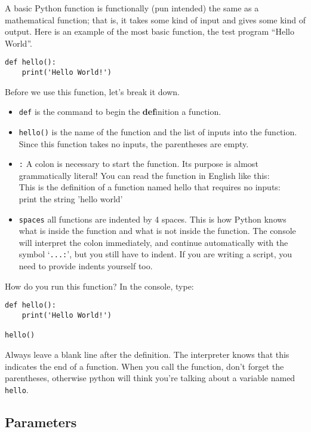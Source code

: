 \documentclass[]{article}
\renewcommand{\_}{\char`_}
\begin{document}
A basic Python function is functionally (pun intended) the same as a mathematical function; that is, it takes some kind of input and gives some kind of output. Here is an example of the most basic function, the test program ``Hello World''. 
\begin{lstlisting}
def hello():
    print('Hello World!')
\end{lstlisting}
Before we use this function, let's break it down. 
\begin{itemize}
\item \texttt{def} is the command to begin the \textbf{def}inition a function. 
\item \texttt{hello()} is the name of the function and the list of inputs into the function. Since this function takes no inputs, the parentheses are empty. 
\item \texttt{:} A colon is necessary to start the function. Its purpose is almost grammatically literal! You can read the function in English like this:\\[1ex] 
This is the definition of a function named hello that requires no inputs: \\
print the string 'hello world'

\item \texttt{spaces} all functions are indented by 4 spaces. This is how Python knows what is inside the function and what is not inside the function. The console will interpret the colon immediately, and continue automatically with the symbol `\texttt{...:}', but you still have to indent. If you are writing a script, you need to provide indents yourself too. 
\end{itemize}

How do you run this function? In the console, type: 
\begin{lstlisting}
def hello():
    print('Hello World!')

hello()
\end{lstlisting}
Always leave a blank line after the definition. The interpreter knows that this indicates the end of a function. When you call the function, don't forget the parentheses, otherwise python will think you're talking about a variable named \texttt{hello}.

\newpage

\subsection{Parameters}
\end{document}
